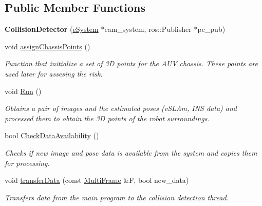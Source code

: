 \subsection*{Public Member Functions}
\begin{DoxyCompactItemize}
\item 
\mbox{\label{classcoldetector_1_1CollisionDetector_aa2169b92cec8e25c107622210b4c2872}} 
{\bfseries Collision\+Detector} (\hyperlink{classcSystem}{c\+System} $\ast$cam\+\_\+system, ros\+::\+Publisher $\ast$pc\+\_\+pub)
\item 
\mbox{\label{classcoldetector_1_1CollisionDetector_af720f23bdcfe3536325fae4891d12ad8}} 
void \hyperlink{classcoldetector_1_1CollisionDetector_af720f23bdcfe3536325fae4891d12ad8}{assign\+Chassis\+Points} ()
\begin{DoxyCompactList}\small\item\em Function that initialize a set of 3D points for the A\+UV chassis. These points are used later for assesing the risk. \end{DoxyCompactList}\item 
void \hyperlink{classcoldetector_1_1CollisionDetector_aa09c4115cdb0c5e3c0ecb3a29d3aac96}{Run} ()
\begin{DoxyCompactList}\small\item\em Obtains a pair of images and the estimated poses (v\+S\+L\+Am, I\+NS data) and processed them to obtain the 3D points of the robot surroundings. \end{DoxyCompactList}\item 
bool \hyperlink{classcoldetector_1_1CollisionDetector_aa4b6c5b052532e545758f84a668b43b2}{Check\+Data\+Availability} ()
\begin{DoxyCompactList}\small\item\em Checks if new image and pose data is available from the system and copies them for processing. \end{DoxyCompactList}\item 
void \hyperlink{classcoldetector_1_1CollisionDetector_a41e80df83d6f79de79798674bef21156}{transfer\+Data} (const \hyperlink{classMultiFrame}{Multi\+Frame} \&F, bool new\+\_\+data)
\begin{DoxyCompactList}\small\item\em Transfers data from the main program to the collision detection thread. \end{DoxyCompactList}\item 

\end{DoxyCompactItemize}
